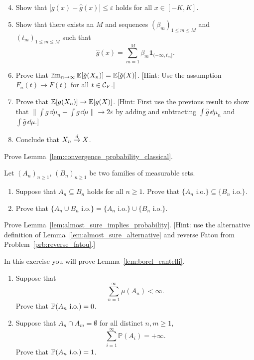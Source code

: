\begin{problem}
\begin{enumerate}[label={(\alph*)}]
\setcounter{enumi}{3}
\item Show that $|g(x) - \hat{g}(x)| \le \varepsilon$ holds for all $x \in [-K , K]$.
\item Show that there exists an $M$ and sequences $(\beta_m)_{1 \le m \le M}$ and $(t_m)_{1 \le m \le M}$ such that
\[
	\hat{g}(x) = \sum_{m = 1}^M \beta_m \mathbf{1}_{(-\infty, t_m]}.
\]
\item Prove that $\lim_{n \to \infty} \mathbb E[\hat{g}(X_n)] = \mathbb E[\hat{g}(X)]$. [Hint: Use the assumption $F_n(t) \to F(t)$ for all $t \in \mathcal C_F$.]
\item Prove that $\mathbb E[g(X_n)] \to \mathbb E[g(X)]$. [Hint: First use the previous result to show that $\| \int g \, \dd \mu_n - \int g \, \dd \mu\| \to 2\varepsilon$ by adding and subtracting $\int \hat{g} \, \dd \mu_n$ and $\int \hat{g} \, \dd \mu$.]
\item Conclude that $X_n \stackrel{d}{\rightarrow} X$.
\end{enumerate}
\end{problem}

\begin{problem}\label{prb:convergence_probability_classic}
Prove Lemma~\ref{lem:convergence_probability_classical}.
\end{problem}

\begin{problem}\label{prb:properties_io}
Let $(A_n)_{n \ge 1}$, $(B_n)_{n \ge 1}$ be two families of measurable sets. 
\begin{enumerate}[label={(\alph*)}]
\item Suppose that $A_n \subseteq B_n$ holds for all $n \ge 1$. Prove that $\{A_n \text{ i.o.}\} \subseteq \{B_n \text{ i.o.}\}$.
\item Prove that $\{A_n \cup B_n \text{ i.o.}\} = \{A_n \text{ i.o.}\} \cup \{B_n \text{ i.o.}\}$.
\end{enumerate}
\end{problem}

\begin{problem}\label{prb:almost_sure_implies_probability}
Prove Lemma~\ref{lem:almost_sure_implies_probability}. [Hint: use the alternative definition of Lemma~\ref{lem:almost_sure_alternative} and reverse Fatou from Problem~\ref{prb:reverse_fatou}.]
\end{problem}

\begin{problem}\label{prb:borel_cantelli}
In this exercise you will prove Lemma~\ref{lem:borel_cantelli}.

\begin{enumerate}[label={(\alph*)}]
\item Suppose that
\[
	\sum_{n=1}^\infty \mu(A_n) < \infty.
\]
Prove that $\mathbb P(A_n \text{ i.o.}) = 0$.
\item Suppose that $A_n \cap A_m = \emptyset$ for all distinct $n,m \ge 1$,
\[
	\sum_{i=1}^\infty \mathbb{P}(A_i) = +\infty.
\]
Prove that $\mathbb P(A_n \text{ i.o.}) = 1$.
\end{enumerate}
\end{problem}

